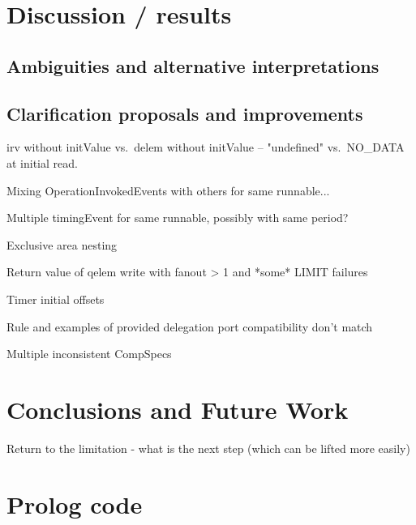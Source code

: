 \documentclass[twocolumn]{article}
\begin{document}
\section{Discussion / results}
\label{sec:Disc}

\subsection{Ambiguities and alternative interpretations}
\label{sec:DiscAmb}

\subsection{Clarification proposals and improvements}
\label{sec:DiscImp}

irv without initValue vs.\ delem without initValue -- "undefined" vs.\ NO\_DATA at initial read.

Mixing OperationInvokedEvents with others for same runnable...

Multiple timingEvent for same runnable, possibly with same period?

Exclusive area nesting

Return value of qelem write with fanout > 1 and *some* LIMIT failures

Timer initial offsets

Rule and examples of provided delegation port compatibility don't match

Multiple inconsistent CompSpecs


\section{Conclusions and Future Work}
\label{sec:Conc}

Return to the limitation - what is the next step (which can be lifted more easily)

\onecolumn
\appendix
\section{Prolog code}
\label{sec:Prolog}


%
\end{document}
